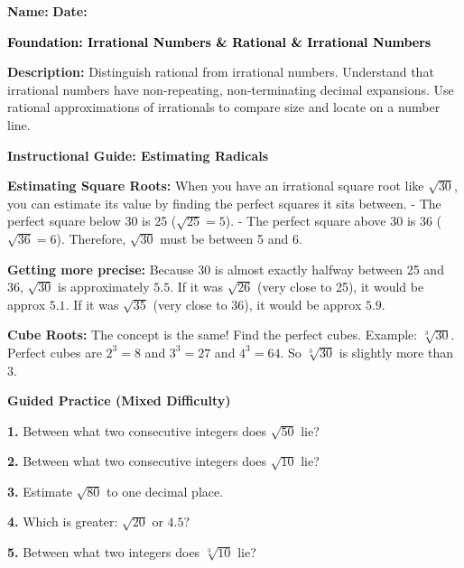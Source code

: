 \documentclass[12pt, letterpaper, fleqn]{article}
\begin{document}
\textbf{Name:} \underline{\hspace{5cm}}
\hfill
\textbf{Date:} \underline{\hspace{3cm}}\\

\begin{tcolorbox}[colback=customteal!20]
    \large\textcolor{black}{\textbf{Foundation: Irrational Numbers & Rational & Irrational Numbers}}
\end{tcolorbox}

\vspace{3mm}

\noindent
\textbf{Description:} Distinguish rational from irrational numbers. Understand that irrational numbers have non-repeating, non-terminating decimal expansions. Use rational approximations of irrationals to compare size and locate on a number line.

\vspace{4mm}


\begin{tcolorbox}[colback=white, colframe=black!25, boxrule=0.6pt, arc=4mm, left=6mm, right=6mm, top=5mm, bottom=5mm]
\textbf{Instructional Guide: Estimating Radicals}

\medskip
\textbf{Estimating Square Roots:} When you have an irrational square root like $\sqrt{30}$, you can estimate its value by finding the perfect squares it sits between.
- The perfect square below 30 is 25 ($\sqrt{25} = 5$).
- The perfect square above 30 is 36 ($\sqrt{36} = 6$).
Therefore, $\sqrt{30}$ must be between 5 and 6.

\textbf{Getting more precise:} 
Because 30 is almost exactly halfway between 25 and 36, $\sqrt{30}$ is approximately $5.5$. 
If it was $\sqrt{26}$ (very close to 25), it would be approx $5.1$.
If it was $\sqrt{35}$ (very close to 36), it would be approx $5.9$.

\textbf{Cube Roots:} The concept is the same! Find the perfect cubes.
Example: $\sqrt[3]{30}$. Perfect cubes are $2^3=8$ and $3^3=27$ and $4^3=64$. 
So $\sqrt[3]{30}$ is slightly more than 3.
\end{tcolorbox}

\vspace{4mm}

\begin{tcolorbox}[colback=white!15, colframe=black, boxrule=1.5pt, arc=4mm, left=6mm, right=6mm, top=5mm, bottom=5mm]
\textbf{Guided Practice (Mixed Difficulty)}

\medskip
\textbf{1.} Between what two consecutive integers does $\sqrt{50}$ lie? \vspace{1cm}

\textbf{2.} Between what two consecutive integers does $\sqrt{10}$ lie? \vspace{1cm}

\textbf{3.} Estimate $\sqrt{80}$ to one decimal place. \vspace{1cm}

\textbf{4.} Which is greater: $\sqrt{20}$ or $4.5$? \vspace{1cm}

\textbf{5.} Between what two integers does $\sqrt[3]{10}$ lie? \vspace{1.5cm}
\end{tcolorbox}
\end{document}
